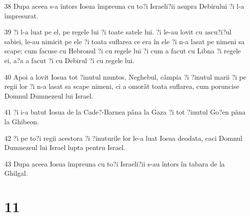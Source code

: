 \par 38 Dupa aceea s-a întors Iosua împreuna cu to?i Israeli?ii asupra Debirului ?i l-a împresurat.
\par 39 ?i l-a luat pe el, pe regele lui ?i toate satele lui. ?i le-au lovit cu ascu?i?ul sabiei, le-au nimicit pe ele ?i toata suflarea ce era în ele ?i n-a lasat pe nimeni sa scape; cum facuse cu Hebronul ?i cu regele lui ?i cum a facut cu Libna ?i regele ei, a?a a facut ?i cu Debirul ?i cu regele lui.
\par 40 Apoi a lovit Iosua tot ?inutul muntos, Neghebul, câmpia ?i ?inutul marii ?i pe regii lor ?i n-a lasat sa scape nimeni, ci a omorât toata suflarea, cum poruncise Domnul Dumnezeul lui Israel.
\par 41 ?i i-a batut Iosua de la Cade?-Barnea pâna la Gaza ?i tot ?inutul Go?en pâna la Ghibeon.
\par 42 ?i pe to?i regii acestora ?i ?inuturile lor le-a luat Iosua deodata, caci Domnul Dumnezeul lui Israel lupta pentru Israel.
\par 43 Dupa aceea Iosua împreuna cu to?i Israeli?ii s-au întors în tabara de la Ghilgal.

\chapter{11}

